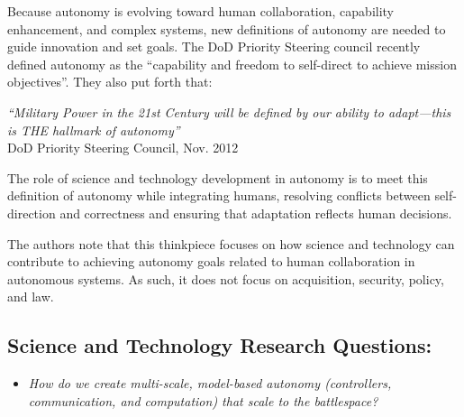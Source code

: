 
Because autonomy is evolving toward human collaboration, capability enhancement, and complex systems, 
new definitions of autonomy are needed to guide innovation and set goals.  The DoD Priority Steering
council recently defined autonomy as the ``capability and freedom to self-direct to achieve mission objectives''.
They also put forth that:
\begin{center}
\parbox[c]{6in}{
{\em ``Military Power in the 21st Century will be defined by our ability to adapt---this is THE hallmark of autonomy''
} \\
 \hspace*{20pt} DoD Priority Steering Council, Nov. 2012
}
\end{center}
The role of science and technology development in autonomy is to meet this definition of autonomy
while integrating humans, resolving conflicts between self-direction and correctness and 
ensuring that adaptation reflects human decisions.

The authors note that this thinkpiece focuses on how science and technology can contribute to achieving autonomy goals related to human collaboration in autonomous systems.
As such, it does not focus on acquisition, security, policy, and law.

\subsection*{Science and Technology Research Questions:}




\begin{itemize}
\item {\em How do we create multi-scale, model-based autonomy (controllers, communication, and computation) that scale to the battlespace?}
\end{itemize}


